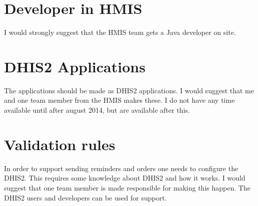 \documentclass[a4paper]{report}
\begin{document}
\section{Developer in HMIS}
I would strongly suggest that the HMIS team gets a Java developer on site.

\section{DHIS2 Applications}
The applications should be made as DHIS2 applications. I would suggest that me and one team member from the HMIS makes these. I do not have any time available until after august 2014, but are available after this.

\section{Validation rules}
In order to support sending reminders and orders one needs to configure the DHIS2. This requires some knowledge about DHIS2 and how it works. I would suggest that one team member is made responsible for making this happen. The DHIS2 users and developers can be used for support.
\end{document}

